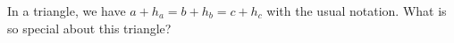 In a triangle, we have $a + h_a = b + h_b = c + h_c$ with the usual notation. What is so special about this triangle?
